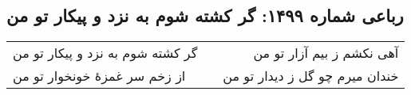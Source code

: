\begin{center}
\section*{رباعی شماره ۱۴۹۹: گر کشته شوم به نزد و پیکار تو من}
\label{sec:1499}
\begin{longtable}{l p{0.5cm} r}
گر کشته شوم به نزد و پیکار تو من
&&
آهی نکشم ز بیم آزار تو من
\\
از زخم سر غمزهٔ خونخوار تو من
&&
خندان میرم چو گل ز دیدار تو من
\\
\end{longtable}
\end{center}
